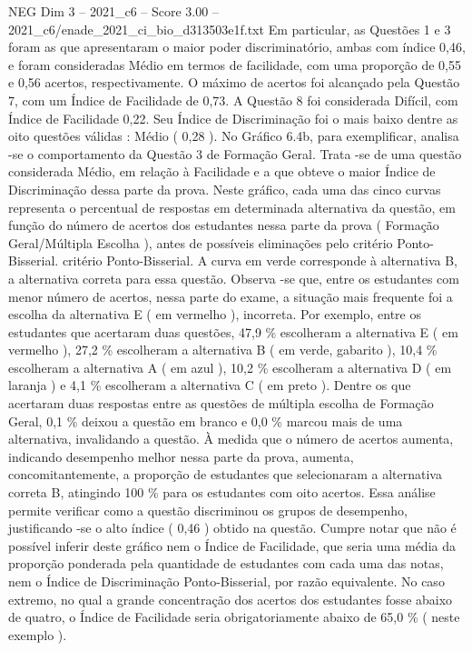 \begin{textsample}{NEG Dim 3 – 2021\_c6 – Score 3.00 – 2021\_c6/enade\_2021\_ci\_bio\_d313503e1f.txt}
Em particular, as Questões 1 e 3 foram as que apresentaram o maior poder discriminatório, ambas com índice 0,46, e foram consideradas Médio em termos de facilidade, com uma proporção de 0,55 e 0,56 acertos, respectivamente.
O máximo de acertos foi alcançado pela Questão 7, com um Índice de Facilidade de 0,73.
A Questão 8 foi considerada Difícil, com Índice de Facilidade 0,22.
Seu Índice de Discriminação foi o mais baixo dentre as oito questões válidas : Médio ( 0,28 ).
No Gráfico 6.4b, para exemplificar, analisa -se o comportamento da Questão 3 de Formação Geral.
Trata -se de uma questão considerada Médio, em relação à Facilidade e a que obteve o maior Índice de Discriminação dessa parte da prova.
Neste gráfico, cada uma das cinco curvas representa o percentual de respostas em determinada alternativa da questão, em função do número de acertos dos estudantes nessa parte da prova ( Formação Geral/Múltipla Escolha ), antes de possíveis eliminações pelo critério Ponto-Bisserial. critério Ponto-Bisserial.
A curva em verde corresponde à alternativa B, a alternativa correta para essa questão.
Observa -se que, entre os estudantes com menor número de acertos, nessa parte do exame, a situação mais frequente foi a escolha da alternativa E ( em vermelho ), incorreta.
Por exemplo, entre os estudantes que acertaram duas questões, 47,9 \% escolheram a alternativa E ( em vermelho ), 27,2 \% escolheram a alternativa B ( em verde, gabarito ), 10,4 \% escolheram a alternativa A ( em azul ), 10,2 \% escolheram a alternativa D ( em laranja ) e 4,1 \% escolheram a alternativa C ( em preto ).
Dentre os que acertaram duas respostas entre as questões de múltipla escolha de Formação Geral, 0,1 \% deixou a questão em branco e 0,0 \% marcou mais de uma alternativa, invalidando a questão.
À medida que o número de acertos aumenta, indicando desempenho melhor nessa parte da prova, aumenta, concomitantemente, a proporção de estudantes que selecionaram a alternativa correta B, atingindo 100 \% para os estudantes com oito acertos.
Essa análise permite verificar como a questão discriminou os grupos de desempenho, justificando -se o alto índice ( 0,46 ) obtido na questão.
Cumpre notar que não é possível inferir deste gráfico nem o Índice de Facilidade, que seria uma média da proporção ponderada pela quantidade de estudantes com cada uma das notas, nem o Índice de Discriminação Ponto-Bisserial, por razão equivalente.
No caso extremo, no qual a grande concentração dos acertos dos estudantes fosse abaixo de quatro, o Índice de Facilidade seria obrigatoriamente abaixo de 65,0 \% ( neste exemplo ).

\end{textsample}
